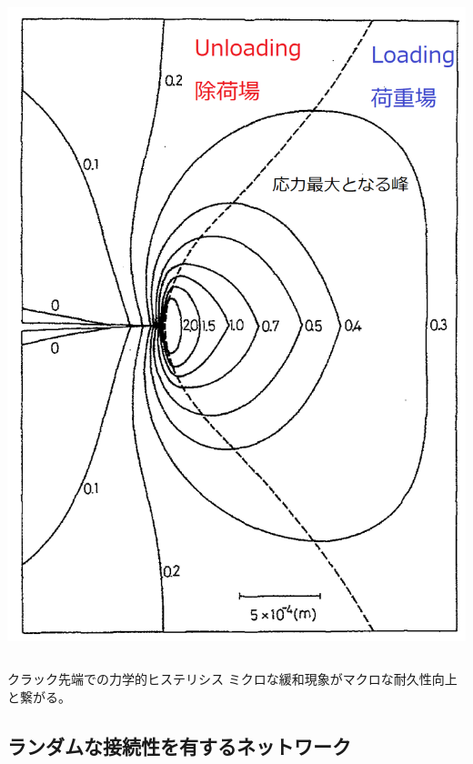 \documentclass[12pt, dvipdfmx]{beamer}
\begin{document}
\begin{frame}
\begin{columns}[totalwidth=1\textwidth]
		\centering
		\includegraphics[width=\textwidth]{./crack.png}
	\end{columns}
	
	\begin{alertblock}{クラック先端での力学的ヒステリシス}
	ミクロな緩和現象がマクロな耐久性向上と繋がる。
	\end{alertblock}
\end{frame}

\subsection{ランダムな接続性を有するネットワーク}
\end{document}

